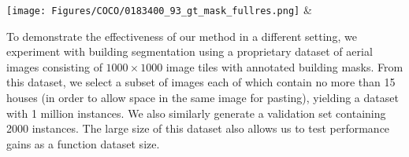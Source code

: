 \documentclass[runningheads]{llncs}
\begin{document}
\texttt{[image: Figures/COCO/0183400\_93\_gt\_mask\_fullres.png]} &%

To demonstrate the effectiveness of our method in a different setting, we experiment with building segmentation using
a proprietary dataset of aerial images
consisting of $1000\!\times\!1000$ image tiles with annotated building masks. From this dataset, we select a subset of images each of which
contain no
more than 15 houses (in order to allow space in the same image for
pasting), yielding a dataset with 1 million instances.  We also 
similarly generate a validation set containing 
2000 instances. The large size of this dataset also allows us to test performance gains as a function dataset size.   
\end{document}
